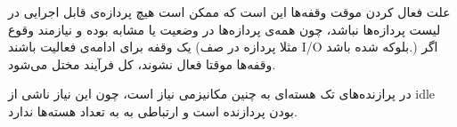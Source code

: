 علت فعال کردن موقت وقفه‌ها این است که ممکن است هیچ پردازه‌ی قابل اجرایی در لیست پردازه‌ها نباشد، چون همه‌ی پردازه‌ها در وضعیت
یا مشابه بوده و نیازمند وقوع یک وقفه برای ادامه‌ی فعالیت باشند (مثلا پردازه در صف I/O بلوکه شده باشد.) اگر وقفه‌ها موقتا فعال نشوند، کل فرآیند مختل می‌شود.

در پرازنده‌های تک هسته‌ای به چنین مکانیزمی نیاز است، چون این نیاز ناشی از idle بودن پردازنده است و ارتباطی به به تعداد هسته‌ها ندارد.